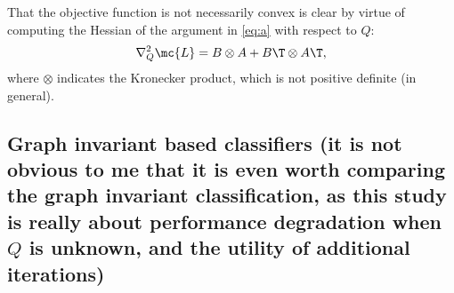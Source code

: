 That the objective function is not necessarily convex is clear by virtue of computing the Hessian of the argument in \eqref{eq:a} with respect to $Q$:
\begin{align}
	\nabla_Q^2 \mc{L} =  B \otimes A + B\T \otimes A\T,
\end{align}
where $\otimes$ indicates the Kronecker product, which is not positive definite (in general).

\subsection{Graph invariant based classifiers (it is not obvious to me that it is even worth comparing the graph invariant classification, as this study is really about performance degradation when $Q$ is unknown, and the utility of additional iterations)} %
\label{sub:graph_invariant_based_classifiers}

